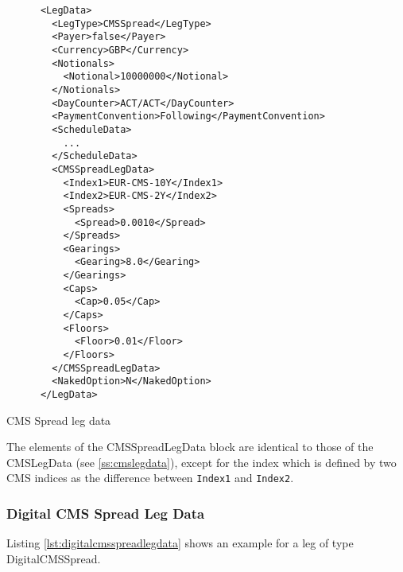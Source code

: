 \begin{listing}[H]
\begin{verbatim}
      <LegData>
        <LegType>CMSSpread</LegType>
        <Payer>false</Payer>
        <Currency>GBP</Currency>
        <Notionals>
          <Notional>10000000</Notional>
        </Notionals>
        <DayCounter>ACT/ACT</DayCounter>
        <PaymentConvention>Following</PaymentConvention>
        <ScheduleData>
          ...
        </ScheduleData>
        <CMSSpreadLegData>
          <Index1>EUR-CMS-10Y</Index1>
          <Index2>EUR-CMS-2Y</Index2>
          <Spreads>
            <Spread>0.0010</Spread>
          </Spreads>
          <Gearings>
            <Gearing>8.0</Gearing>
          </Gearings>
          <Caps>
            <Cap>0.05</Cap>
          </Caps>
          <Floors>
            <Floor>0.01</Floor>
          </Floors>
        </CMSSpreadLegData>
        <NakedOption>N</NakedOption>
      </LegData>
\end{verbatim}
\caption{CMS Spread leg data}
\label{lst:cmsspreadlegdata}
\end{listing}

The elements of the CMSSpreadLegData block are identical to those of the CMSLegData (see \ref{ss:cmslegdata}), except
for the index which is defined by two CMS indices as the difference between \verb+Index1+ and \verb+Index2+.

\subsubsection{Digital CMS Spread Leg Data}
\label{ss:digitalcmsspreadlegdata}

Listing \ref{lst:digitalcmsspreadlegdata} shows an example for a leg of type DigitalCMSSpread.

